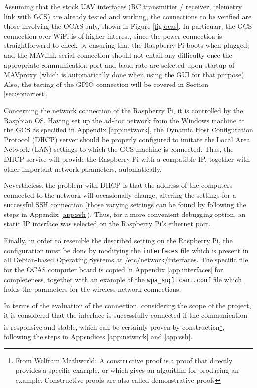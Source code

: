 Assuming that the stock UAV interfaces (RC transmitter / receiver, telemetry link with GCS) are already tested and working, the connections to be verified are those involving the OCAS only, shown in Figure \ref{fig:ocas}.
In particular, the GCS connection over WiFi is of higher interest, since the power connection is straightforward to check by ensuring that the Raspberry Pi boots when plugged; and the MAVlink serial connection should not entail any difficulty once the appropriate communication port and baud rate are selected upon startup of MAVproxy (which is automatically done when using the GUI for that purpose).
Also, the testing of the GPIO connection will be covered in Section \ref{sec:sonartest}.

Concerning the network connection of the Raspberry Pi, it is controlled by the Raspbian OS.
Having set up the ad-hoc network from the Windows machine at the GCS as specified in Appendix \ref{app:network}, the Dynamic Host Configuration Protocol (DHCP) server should be properly configured to imitate the Local Area Network (LAN) settings to which the GCS machine is connected.
Thus, the DHCP service will provide the Raspberry Pi with a compatible IP, together with other important network parameters, automatically. 

Nevertheless, the problem with DHCP is that the address of the computers connected to the network will occasionally change, altering the settings for a successful SSH connection (those varying settings can be found by following the steps in Appendix \ref{app:ssh}).
Thus, for a more convenient debugging option, an static IP interface was selected on the Raspberry Pi's ethernet port.

Finally, in order to resemble the described setting on the Raspberry Pi, the configuration must be done by modifying the \texttt{interfaces} file which is present in all Debian-based Operating Systems at /etc/network/interfaces.
The specific file for the OCAS computer board is copied in Appendix \ref{app:interfaces} for completeness, together with an example of the \texttt{wpa\_suplicant.conf} file which holds the parameters for the wireless network connections.

In terms of the evaluation of the connection, considering the scope of the project, it is considered that the interface is successfully connected if the communication is responsive and stable, which can be certainly proven by construction\footnote{From Wolfram Mathworld: A constructive proof is a proof that directly provides a specific example, or which gives an algorithm for producing an example. Constructive proofs are also called demonstrative proofs}, following the steps in Appendices \ref{app:network} and \ref{app:ssh}.


